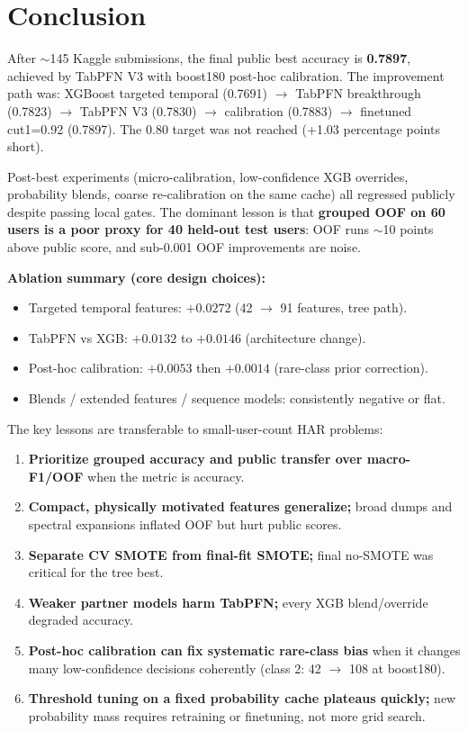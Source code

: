 \documentclass[12pt, a4paper]{article}
\begin{document}
\section{Conclusion}

After $\sim$145 Kaggle submissions, the final public best accuracy is \textbf{0.7897}, achieved by TabPFN V3 with boost180 post-hoc calibration. The improvement path was: XGBoost targeted temporal (0.7691) $\rightarrow$ TabPFN breakthrough (0.7823) $\rightarrow$ TabPFN V3 (0.7830) $\rightarrow$ calibration (0.7883) $\rightarrow$ finetuned cut1=0.92 (0.7897). The 0.80 target was not reached (+1.03 percentage points short).

Post-best experiments (micro-calibration, low-confidence XGB overrides, probability blends, coarse re-calibration on the same cache) all regressed publicly despite passing local gates. The dominant lesson is that \textbf{grouped OOF on 60 users is a poor proxy for 40 held-out test users}: OOF runs $\sim$10 points above public score, and sub-0.001 OOF improvements are noise.

\textbf{Ablation summary (core design choices):}
\begin{itemize}
    \item Targeted temporal features: $+0.0272$ (42 $\rightarrow$ 91 features, tree path).
    \item TabPFN vs XGB: $+0.0132$ to $+0.0146$ (architecture change).
    \item Post-hoc calibration: $+0.0053$ then $+0.0014$ (rare-class prior correction).
    \item Blends / extended features / sequence models: consistently negative or flat.
\end{itemize}

The key lessons are transferable to small-user-count HAR problems:

\begin{enumerate}
    \item \textbf{Prioritize grouped accuracy and public transfer over macro-F1/OOF} when the metric is accuracy.
    \item \textbf{Compact, physically motivated features generalize;} broad dumps and spectral expansions inflated OOF but hurt public scores.
    \item \textbf{Separate CV SMOTE from final-fit SMOTE;} final no-SMOTE was critical for the tree best.
    \item \textbf{Weaker partner models harm TabPFN;} every XGB blend/override degraded accuracy.
    \item \textbf{Post-hoc calibration can fix systematic rare-class bias} when it changes many low-confidence decisions coherently (class 2: 42 $\rightarrow$ 108 at boost180).
    \item \textbf{Threshold tuning on a fixed probability cache plateaus quickly;} new probability mass requires retraining or finetuning, not more grid search.
\end{enumerate}
\end{document}
